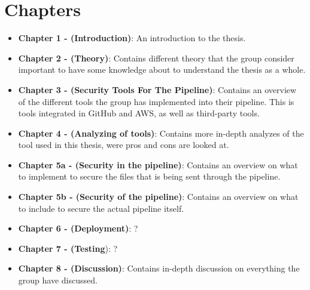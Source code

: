 \section{Chapters}
\begin{itemize}
    \item \textbf{Chapter 1 - (Introduction)}: An introduction to the thesis.
    \item \textbf{Chapter 2 - (Theory)}: Contains different theory that the group consider important 
    to have some knowledge about to understand the thesis as a whole.
    \item \textbf{Chapter 3 - (Security Tools For The Pipeline)}: Contains an overview of the different tools the group has implemented into their pipeline. This is tools integrated in GitHub and AWS, as well as third-party tools. 
    \item \textbf{Chapter 4 - (Analyzing of tools)}: Contains more in-depth analyzes of the tool used in this thesis, were pros and cons are looked at. 
    \item \textbf{Chapter 5a - (Security in the pipeline)}: Contains an overview on what to implement to secure the files that is being sent through the pipeline. 
    \item \textbf{Chapter 5b - (Security of the pipeline)}: Contains an overview on what to include to secure the actual pipeline itself. 
    \item \textbf{Chapter 6 - (Deployment)}: ?
    \item \textbf{Chapter 7 - (Testing}): ?
    \item \textbf{Chapter 8 - (Discussion)}: Contains in-depth discussion on everything the group have discussed. 

\end{itemize}







